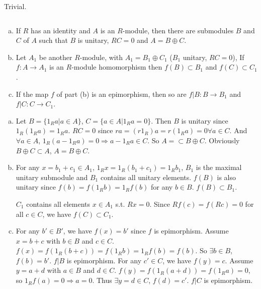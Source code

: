 \begin{answer}
    Trivial.
\end{answer}

$$ $$

\begin{ex}
    \begin{enumerate}[(a)]
        \item If $R$ has an identity and $A$ is an $R$-module, then there are submodules $B$ and $C$ of $A$ such that $B$ is unitary, $RC=0$ and $A=B\oplus C$.
        \item Let $A_{1}$ be another $R$-module, with $A_{1}=B_{1}\oplus C_{1}$ ($B_{1}$ unitary, $RC=0$), If $f:A\to A_{1}$ is an $R$-module homomorphism then $f(B)\subset B_{1}$ and $f(C)\subset C_{1}$.
        \item If the map $f$ of part (b) is an epimorphism, then so are $f|B:B\to B_{1}$ and $f|C:C\to C_{1}$.
    \end{enumerate}
\end{ex}

\begin{answer}
    \begin{enumerate}[(a)]
        \item Let $B=\{1_{R}a|a\in A\}$, $C=\{a\in A|1_{R}a=0\}$. Then $B$ is unitary since $1_{R}(1_{R}a)=1_{R}a$. $RC=0$ since $ra=(r1_{R})a=r(1_{R}a)=0 \forall a\in C$. And $\forall a\in A$, $1_{R}(a-1_{R}a)=0\Rightarrow a-1_{R}a\in C$. So $A=\subset B\oplus C$. Obviously $B\oplus C\subset A$, $A=B\oplus C$.
        \item For any $x=b_{1}+c_{1}\in A_{1}$, $1_{R}x=1_{R}(b_{1}+c_{1})=1_{R}b_{1}$, $B_{1}$ is the maximal unitary submodule and $B_{1}$ contains all unitary elements. $f(B)$ is also unitary since $f(b)=f(1_{R}b)=1_{R}f(b)$ for any $b\in B$. $f(B)\subset B_{1}$.
        
        $C_{1}$ contains all elements $x\in A_{1}$ s.t. $Rx=0$. Since $Rf(c)=f(Rc)=0$ for all $c\in C$, we have $f(C)\subset C_{1}$.
        \item For any $b'\in B'$, we have $f(x)=b'$ since $f$ is epimorphism. Assume $x=b+c$ with $b\in B$ and $c\in C$. $f(x)=f(1_{R}(b+c))=f(1_{R}b)=1_{R}f(b)=f(b)$. So $\exists b\in B$, $f(b)=b'$. $f|B$ is epimorphism. For any $c'\in C$, we have $f(y)=c$. Assume $y=a+d$ with $a\in B$ and $d\in C$. $f(y)=f(1_{R}(a+d))=f(1_{R}a)=0$, so $1_{R}f(a)=0\Rightarrow a=0$. Thus $\exists y=d\in C$, $f(d)=c'$. $f|C$ is epimorphism.
    \end{enumerate}
\end{answer}

